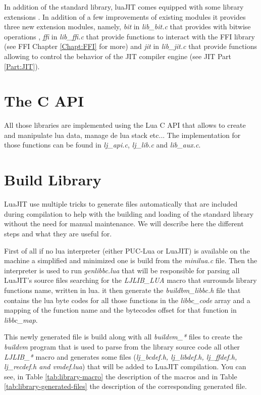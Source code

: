 In addition of the standard library, luaJIT comes equipped with some library
extensions \cite{extensions}. In addition of a few improvements of existing
modules it provides three new extension modules, namely, \emph{bit} in
\emph{lib\_bit.c} that provides with bitwise operations \cite{bitOp}, \emph{ffi}
in \emph{lib\_ffi.c} that provide functions to interact with the FFI library
(see FFI Chapter \ref{Chapt:FFI} for more) and \emph{jit} in \emph{lib\_jit.c}
that provide functions allowing to control the behavior of the JIT compiler
engine (see JIT Part \ref{Part:JIT}).

\section{The C API}
\label{Sec:c-api}

All those libraries are implemented using the Lua C API that allows to create
and manipulate lua data, manage de lua stack etc... The implementation for those
functions can be found in \emph{lj\_api.c}, \emph{lj\_lib.c} and \emph{lib\_aux.c}.

\section{Build Library}
\label{Sec:build-lib}

LuaJIT use multiple tricks to generate files automatically that are included
during compilation to help with the building and loading of the standard library
without the need for manual maintenance. We will describe here the different
steps and what they are useful for.

First of all if no lua interpreter
(either PUC-Lua or LuaJIT) is available on the machine a simplified and
minimized one is build from the \emph{minilua.c} file. Then the interpreter is
used to run \emph{genlibbc.lua} that will be responsible for parsing all LuaJIT's
source files searching for the \emph{LJLIB\_LUA} macro that surrounds library
functions name, written in lua. it then generate the \emph{buildbm\_libbc.h}
file that contains the lua byte codes for all those functions in the
\emph{libbc\_code} array and a mapping of the function name and the bytecodes
offset for that function in \emph{libbc\_map}.

This newly generated file is
build along with all \emph{buildvm\_*} files to create the \emph{buildvm}
program that is used to parse from the library source code all other
\emph{LJLIB\_*} macro and generates some files
(\emph{lj\_bcdef.h, lj\_libdef.h, lj\_ffdef.h, lj\_recdef.h and vmdef.lua})
that will be added to LuaJIT compilation. You can see, in Table
\ref{tab:library-macro} the description of the macros and in Table
\ref{tab:library-generated-files} the description of the corresponding generated
file.

